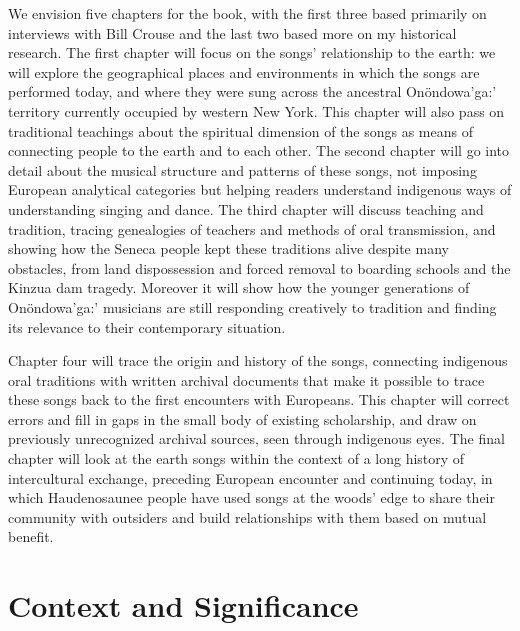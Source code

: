\documentclass[12pt]{article}
\begin{document}
We envision five chapters for the book, with the first three based primarily
on interviews with Bill Crouse and the last two based more on my historical
research.
The first chapter will focus on the songs' relationship to the earth:
we will explore the geographical places and environments in which the songs
are performed today, and where they were sung across the ancestral
Onöndowa'ga:' territory currently occupied by western New York.
This chapter will also pass on traditional teachings about the spiritual
dimension of the songs as means of connecting people to the earth and to each
other.
The second chapter will go into detail about the musical structure and
patterns of these songs, not imposing European analytical categories but
helping readers understand indigenous ways of understanding singing and dance.
The third chapter will discuss teaching and tradition, tracing genealogies of
teachers and methods of oral transmission, and showing how the Seneca people
kept these traditions alive despite many obstacles, from land dispossession
and forced removal to boarding schools and the Kinzua dam tragedy.
Moreover it will show how the younger generations of Onöndowa'ga:' musicians
are still responding creatively to tradition and finding its relevance to
their contemporary situation.

Chapter four will trace the origin and history of the songs, connecting
indigenous oral traditions with written archival documents that make it
possible to trace these songs back to the first encounters with Europeans.
This chapter will correct errors and fill in gaps in the small body of
existing scholarship, and draw on previously unrecognized archival sources,
seen through indigenous eyes.
The final chapter will look at the earth songs within the context of a long
history of intercultural exchange, preceding European encounter and continuing
today, in which Haudenosaunee people have used songs at the woods' edge to
share their community with outsiders and build relationships with them based
on mutual benefit.

\section{Context and Significance}
\end{document}
